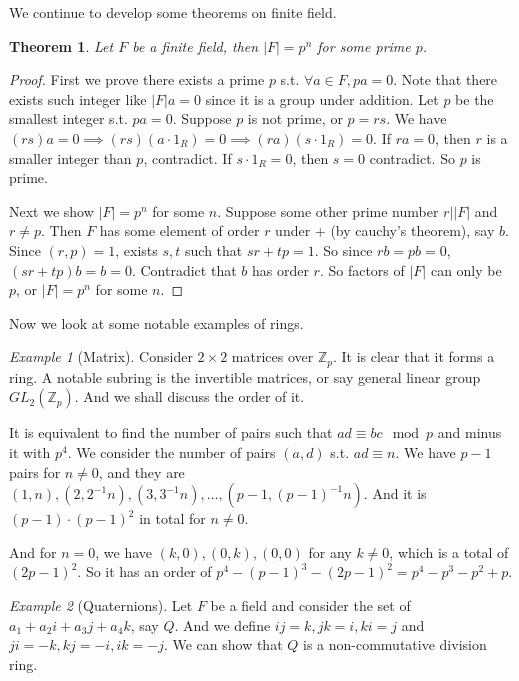 \documentclass{article}
\newtheorem{thm}{Theorem}[section]
\theoremstyle{definition}
\theoremstyle{remark}
\newtheorem*{eg}{Example}
\begin{document}
We continue to develop some theorems on finite field.
\begin{thm}
  Let $F$ be a finite field, then $|F| = p^n$ for some prime $p$.   
\end{thm}
\begin{proof}
  First we prove there exists a prime $p$ s.t. $\forall a \in F, pa = 0$. 
  Note that there exists such integer like $|F| a = 0$ since it is a group under addition. 
  Let $p$ be the smallest integer s.t. $pa = 0$. Suppose $p$ is not prime, or $p = rs$.
  We have $(rs)a = 0 \implies (rs) (a \cdot 1_R) = 0 \implies (ra) (s\cdot 1_R) = 0$. 
  If $ra = 0$, then $r$ is a smaller integer than $p$, contradict. If $s \cdot 1_R = 0$, then 
  $s = 0$ contradict. So $p$ is prime.

  Next we show $|F| = p^n$ for some $n$. Suppose some other prime number $r | |F|$ and $r \neq p$.
  Then $F$ has some element of order $r$ under $+$ (by cauchy's theorem), say $b$. 
  Since $(r, p) = 1$, exists $s,t$ such that $sr + tp = 1$. So since $rb = pb = 0$, 
  $(sr + tp)b = b = 0$. Contradict that $b$ has order $r$. So factors of $|F|$ can only be 
  $p$, or $|F| = p^n$ for some $n$.
 \end{proof}

Now we look at some notable examples of rings. 
\begin{eg}[Matrix]
  Consider $2\times 2$ matrices over $\mathbb{Z}_p$. It is clear that it forms a 
  ring. A notable subring is the invertible matrices, 
  or say general linear group $GL_2(\mathbb{Z}_p)$. And we shall discuss the order of it. 

  It is equivalent to find the number of pairs such that $ad \equiv bc \mod p$ and minus it with $p^4$. 
  We consider the number of pairs $(a,d)$ s.t. $ad \equiv n$. We have $p-1$ pairs for $n \neq 0$, and 
  they are $(1, n), (2, 2^{-1} n), (3, 3^{-1} n), \ldots, (p-1, (p-1)^{-1} n)$. And it is 
  $(p-1) \cdot (p-1)^2$ in total for $n \neq 0$. 

  And for $n = 0$, we have $(k, 0), (0, k), (0, 0)$ for any $k \neq 0$, which is a total of $(2p-1)^2$.
  So it has an order of $p^4 - (p-1)^3 - (2p-1)^2 = p^4 - p^3 - p^2 + p$.
\end{eg}

\begin{eg}[Quaternions]
  Let $F$ be a field and consider the set of $a_1 + a_2 i + a_3 j + a_4 k$, say $Q$. And we 
  define $ij = k, jk = i, ki = j$ and $ji = -k, kj = -i, ik = -j$. We can show that 
  $Q$ is a non-commutative division ring. 
\end{eg}
\end{document}
